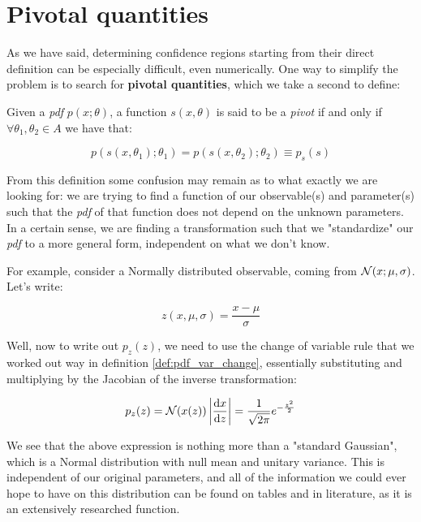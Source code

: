 \section{Pivotal quantities}
As we have said, determining confidence regions starting from their direct definition can be especially difficult, even numerically. One way to simplify the problem is to search for \textbf{pivotal quantities}, which we take a second to define:

\begin{definition}
	Given a \emph{pdf} $p(x;\theta)$, a function $s(x,\theta)$ is said to be a \emph{pivot} if and only if $\forall \theta_1,\theta_2\in A$ we have that:
	
	\[
	p\left(s(x,\theta_1);\theta_1\right) = p\left(s(x,\theta_2);\theta_2\right) \equiv p_s(s)
	\]
\end{definition}

From this definition some confusion may remain as to what exactly we are looking for: we are trying to find a function of our observable(s) and parameter(s) such that the \emph{pdf} of that function does not depend on the unknown parameters. In a certain sense, we are finding a transformation such that we "standardize" our \emph{pdf} to a more general form, independent on what we don't know. 

For example, consider a Normally distributed observable, coming from $\mathcal{N}(x;\mu,\sigma)$. Let's write:

	\[
	z\left(x,\mu,\sigma\right) = \frac{x-\mu}{\sigma}
	\]

Well, now to write out $p_z(z)$, we need to use the change of variable rule that we worked out way in definition \ref{def:pdf_var_change}, essentially substituting and multiplying by the Jacobian of the inverse transformation:

	\[
	p_z(z) = \mathcal{N}(x(z))\left|\frac{\mathrm{d} x}{\mathrm{d} z}\right| = \frac{1}{\sqrt{2\pi}}e^{-\frac{z^2}{2}}
	\]

We see that the above expression is nothing more than a "standard Gaussian", which is a Normal distribution with null mean and unitary variance. This is independent of our original parameters, and all of the information we could ever hope to have on this distribution can be found on tables and in literature, as it is an extensively researched function. 

